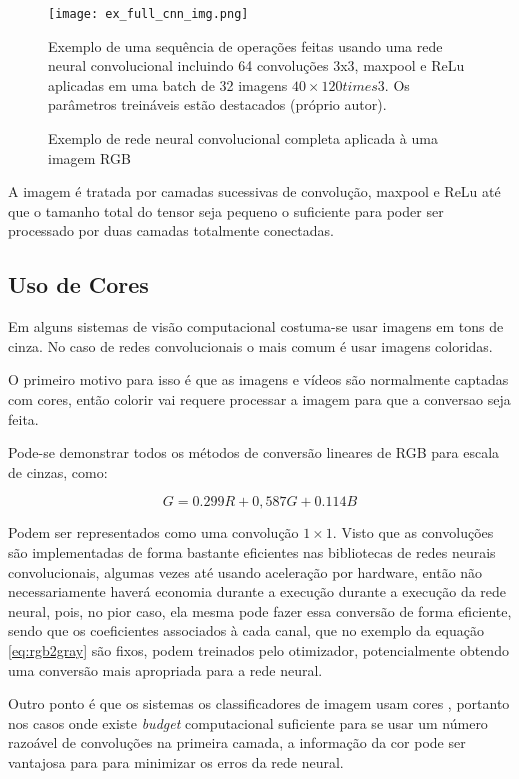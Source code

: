 \begin{figure}[!htb]
	\centering
	\texttt{[image: ex\_full\_cnn\_img.png]}
	\caption{Exemplo de rede neural convolucional completa aplicada à uma imagem
	RGB}
	\label{fig:ex_full_cnn_img}
	Exemplo de uma sequência de operações feitas usando uma rede neural
	convolucional incluindo 64 convoluções 3x3, maxpool e ReLu aplicadas em uma
	batch de 32 imagens $40 \times 120 times 3$. Os parâmetros treináveis
	estão destacados (próprio autor).
\end{figure}

A imagem é tratada por camadas sucessivas de convolução, maxpool e ReLu até que
o tamanho total do tensor seja pequeno o suficiente para poder ser processado
por duas camadas totalmente conectadas. 

\subsection{Uso de Cores}
Em alguns sistemas de visão computacional costuma-se usar imagens em
tons de cinza. No caso de redes convolucionais o mais comum é usar
imagens coloridas.

O primeiro motivo para isso é que as imagens e vídeos são normalmente
captadas com cores, então colorir vai requere processar a imagem para
que a conversao seja feita. 

Pode-se demonstrar todos os métodos de conversão lineares de RGB para escala de
cinzas, como:

\begin{equation} \label{eq:rgb2gray}
	G=0.299R + 0,587G + 0.114B
\end{equation}

Podem ser representados como uma convolução $1 \times 1$. Visto que as
convoluções são implementadas de forma bastante eficientes nas bibliotecas
de redes neurais convolucionais, algumas vezes até usando aceleração por
hardware, então não necessariamente haverá economia durante a execução
durante a execução da rede neural, pois, no pior caso, ela mesma pode fazer
essa conversão de forma eficiente, sendo que os coeficientes associados
à cada canal, que no exemplo da equação \ref{eq:rgb2gray} são fixos, podem
treinados pelo otimizador, potencialmente obtendo uma conversão mais apropriada
para a rede neural.

Outro ponto é que os sistemas os classificadores de imagem usam cores
\cite{szegedy2015going} \cite{hasanpour2016lets}, portanto nos casos onde
existe \emph{budget} computacional suficiente para se usar um número razoável
de convoluções na primeira camada, a informação da cor pode ser vantajosa
para para minimizar os erros da rede neural.


